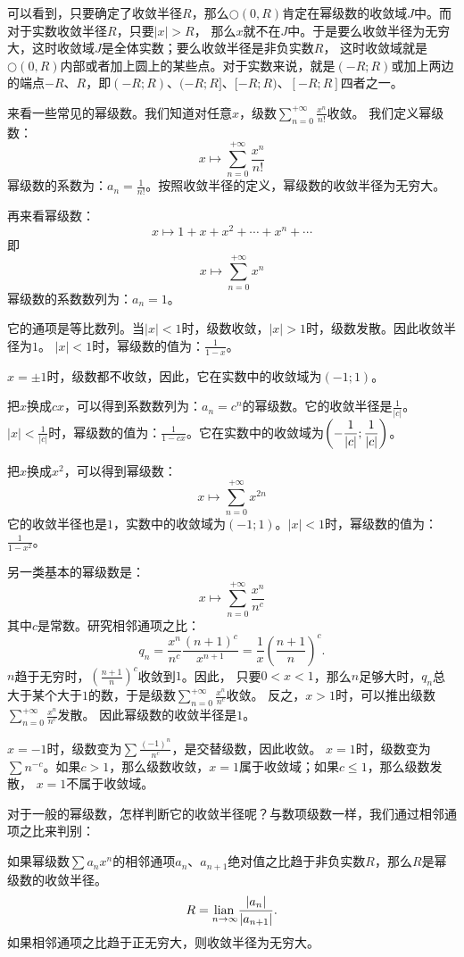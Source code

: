 \documentclass[12pt,UTF8]{ctexbook}
\begin{document}
可以看到，只要确定了收敛半径$R$，那么$\bigcirc(0,R)$肯定在幂级数的收敛域$J$中。而对于实数收敛半径$R$，只要$|x|>R$，
那么$x$就不在$J$中。于是要么收敛半径为无穷大，这时收敛域$J$是全体实数；要么收敛半径是非负实数$R$，
这时收敛域就是$\bigcirc(0,R)$内部或者加上圆上的某些点。对于实数来说，就是$(-R;R)$或加上两边的端点$-R$、$R$，即$(-R;R)$、$(-R;R]$、$[-R;R)$、$[-R;R]$四者之一。

来看一些常见的幂级数。我们知道对任意$x$，级数$\sum_{n=0}^{+\infty} \frac{x^n}{n!}$收敛。
我们定义幂级数：
$$ x \mapsto \sum_{n=0}^{+\infty} \frac{x^n}{n!} $$
幂级数的系数为：$a_n = \frac{1}{n!}$。按照收敛半径的定义，幂级数的收敛半径为无穷大。

再来看幂级数：
$$ x \mapsto 1 + x + x^2 + \cdots + x^n + \cdots $$
即
$$ x \mapsto \sum_{n=0}^{+\infty} x^n $$
幂级数的系数数列为：$a_n = 1$。

它的通项是等比数列。当$|x|<1$时，级数收敛，$|x|>1$时，级数发散。因此收敛半径为$1$。
$|x|<1$时，幂级数的值为：$\frac{1}{1 - x}$。

$x = \pm 1$时，级数都不收敛，因此，它在实数中的收敛域为$(-1;1)$。

把$x$换成$cx$，可以得到系数数列为：$a_n = c^n$的幂级数。它的收敛半径是$\frac{1}{|c|}$。
$|x|<\frac{1}{|c|}$时，幂级数的值为：$\frac{1}{1 - cx}$。它在实数中的收敛域为$\displaystyle\left(-\frac{1}{|c|};\frac{1}{|c|}\right)$。

把$x$换成$x^2$，可以得到幂级数：
$$ x \mapsto \sum_{n=0}^{+\infty} x^{2n} $$
它的收敛半径也是$1$，实数中的收敛域为$(-1;1)$。$|x|<1$时，幂级数的值为：$\frac{1}{1 - x^2}$。

另一类基本的幂级数是：
$$ x \mapsto \sum_{n=0}^{+\infty} \frac{x^n}{n^c}$$
其中$c$是常数。研究相邻通项之比：
$$ q_n = \frac{x^n}{n^c} \frac{(n+1)^c}{x^{n+1}} = \frac{1}{x} \left(\frac{n+1}{n}\right)^c. $$
$n$趋于无穷时，$\displaystyle \left(\frac{n+1}{n}\right)^c$收敛到$1$。因此，
只要$0<x<1$，那么$n$足够大时，$q_n$总大于某个大于$1$的数，于是级数$\sum_{n=0}^{+\infty} \frac{x^n}{n^c}$收敛。
反之，$x>1$时，可以推出级数$\sum_{n=0}^{+\infty} \frac{x^n}{n^c}$发散。
因此幂级数的收敛半径是$1$。

$x=-1$时，级数变为$\sum \frac{(-1)^n}{n^c}$，是交替级数，因此收敛。
$x=1$时，级数变为$\sum n^{-c}$。如果$c>1$，那么级数收敛，$x=1$属于收敛域；如果$c\leqslant 1$，那么级数发散，
$x=1$不属于收敛域。

对于一般的幂级数，怎样判断它的收敛半径呢？与数项级数一样，我们通过相邻通项之比来判别：

\begin{tm}
    如果幂级数$\sum a_n x^n$的相邻通项$a_n$、$a_{n+1}$绝对值之比趋于非负实数$R$，那么$R$是幂级数的收敛半径。
    $$ R = \underset{n\to\infty}{\operatorname{lian}\,} \frac{|a_n|}{|a_{n+1}|}. $$
    如果相邻通项之比趋于正无穷大，则收敛半径为无穷大。
\end{tm}
\end{document}
